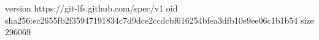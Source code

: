 version https://git-lfs.github.com/spec/v1
oid sha256:ec2655fb2f35947191834c7d9dce2ccdcbf616254bfea3dfb10e9ee06c1b1b54
size 296069
